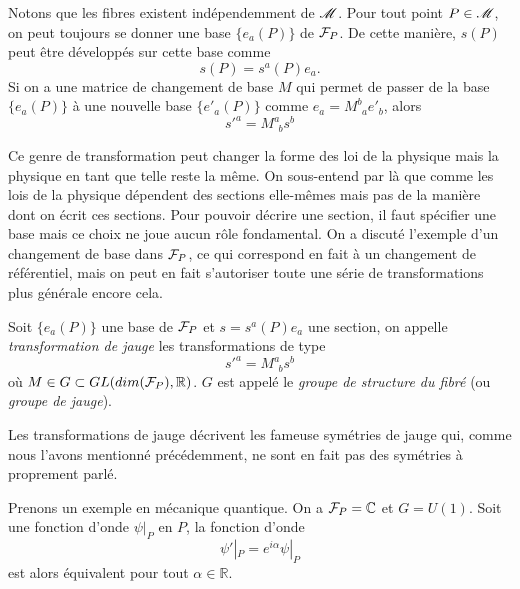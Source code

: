 \documentclass[a4paper,11pt]{report}
\begin{document}
                Notons que les fibres existent indépendemment de $\mathscr{M}$. Pour tout point $P\in\mathscr{M}$, on peut toujours se donner une base $\{e_a(P)\}$ de $\mathcal{F}_P$. De cette manière, $s(P)$ peut être développés sur cette base comme
                \begin{equation}
                    s(P) = s^a(P)e_a.
                \end{equation}
                Si on a une matrice de changement de base $M$ qui permet de passer de la base $\{e_a(P)\}$ à une nouvelle base $\{e'_a(P)\}$ comme $e_a = M^b_{~~a} e'_b$, alors
                \begin{equation}
                    s'^a = M^a_{~~b}s^b
                \end{equation}
                
                Ce genre de transformation peut changer la forme des loi de la physique mais la physique en tant que telle reste la même. On sous-entend par là que comme les lois de la physique dépendent des sections elle-mêmes mais pas de la manière dont on écrit ces sections. Pour pouvoir décrire une section, il faut spécifier une base mais ce choix ne joue aucun rôle fondamental. On a discuté l'exemple d'un changement de base dans $\mathcal{F}_P$, ce qui correspond en fait à un changement de référentiel, mais on peut en fait s'autoriser toute une série de transformations plus générale encore cela.
                
                \begin{defn}
                    Soit $\{e_a(P)\}$ une base de $\mathcal{F}_P$ et $s = s^a(P)e_a$ une section, on appelle \textit{transformation de jauge} les transformations de type
                    \begin{equation}
                    s'^a = M^a_{~~b}s^b
                    \end{equation}
                    où $M\in G\subset GL(dim(\mathcal{F}_P),\mathbb{R})$. $G$ est appelé le \textit{groupe de structure du fibré} (ou \textit{groupe de jauge}).
                \end{defn}
                
                Les transformations de jauge décrivent les fameuse symétries de jauge qui, comme nous l'avons mentionné précédemment, ne sont en fait pas des symétries à proprement parlé.
                
                \begin{exmp}
                    Prenons un exemple en mécanique quantique. On a $\mathcal{F}_P = \mathbb{C}$ et $G = U(1)$. Soit une fonction d'onde $\psi|_P$ en $P$, la fonction d'onde
                    \begin{equation}
                        \psi'|_P = e^{i\alpha}\psi|_P
                    \end{equation}
                    est alors équivalent pour tout $\alpha\in\mathbb{R}$.
                \end{exmp}
                
\end{document}
